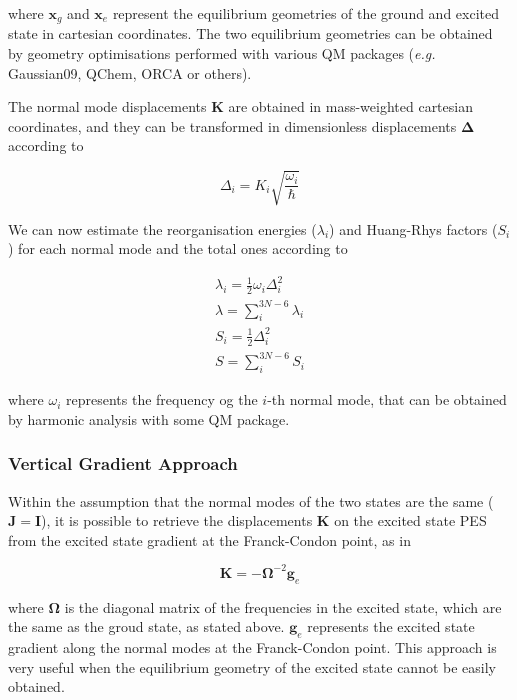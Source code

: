 \documentclass[a4paper]{article}
\newcommand{\matr}[1]{\mathbf{#1}}
\begin{document}
where $\matr{x}_g$ and $\matr{x}_e$ represent the equilibrium geometries of the ground and excited state in cartesian coordinates. The two equilibrium geometries can be obtained by geometry optimisations performed with various QM packages (\textit{e.g.} Gaussian09, QChem, ORCA or others).

The normal mode displacements $\matr{K}$ are obtained in mass-weighted cartesian coordinates, and they can be transformed in dimensionless displacements $\matr{\Delta}$ according to\cite{Neese2007}

\begin{equation}
\Delta_i = K_i\sqrt{\frac{\omega_i}{\hbar}}
\end{equation}

We can now estimate the reorganisation energies ($\lambda_i$) and Huang-Rhys factors ($S_i$) for each normal mode and the total ones according to

\begin{gather}
\lambda_i = \frac{1}{2} \omega_i \Delta_i^2 \\
\lambda = \sum_i^{3N-6} \lambda_i \\
S_i = \frac{1}{2} \Delta_i^2 \\
S = \sum_i^{3N-6} S_i
\end{gather}

where $\omega_i$ represents the frequency og the $i$-th normal mode, that can be obtained by harmonic analysis with some QM package.

\subsubsection*{Vertical Gradient Approach}

Within the assumption that the normal modes of the two states are the same ($\matr{J} = \matr{I}$), it is possible to retrieve the displacements $\matr{K}$ on the excited state PES from the excited state gradient at the Franck-Condon point, as in

\begin{equation}
\matr{K} = -\matr{\Omega}^{-2}\matr{g}_e
\end{equation}

where $\matr{\Omega}$ is the diagonal matrix of the frequencies in the excited state, which are the same as the groud state, as stated above. $\matr{g}_e$ represents the excited state gradient along the normal modes at the Franck-Condon point. This approach is very useful when the equilibrium geometry of the excited state cannot be easily obtained.
\end{document}
